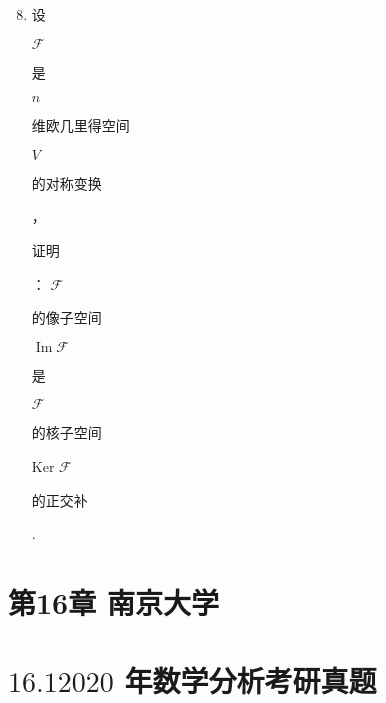 \documentclass[10pt]{article}
\begin{document}
\begin{enumerate}
  \setcounter{enumi}{7}
  \item \begin{CJK}{UTF8}{mj}设\end{CJK} $\mathscr{F}$ \begin{CJK}{UTF8}{mj}是\end{CJK} $n$ \begin{CJK}{UTF8}{mj}维欧几里得空间\end{CJK} $V$ \begin{CJK}{UTF8}{mj}的对称变换\end{CJK}，\begin{CJK}{UTF8}{mj}证明\end{CJK}： $\mathscr{F}$ \begin{CJK}{UTF8}{mj}的像子空间\end{CJK} $\operatorname{Im} \mathscr{F}$ \begin{CJK}{UTF8}{mj}是\end{CJK} $\mathscr{F}$ \begin{CJK}{UTF8}{mj}的核子空间\end{CJK} Ker $\mathscr{F}$ \begin{CJK}{UTF8}{mj}的正交补\end{CJK}.
\end{enumerate}
\section{第16章 南京大学}
\section{$16.12020$ 年数学分析考研真题}
\end{document}
